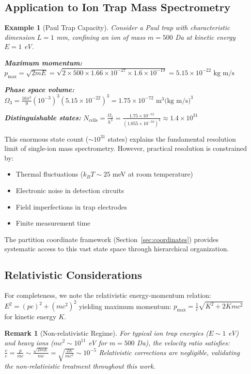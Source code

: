 \documentclass[twocolumn,10pt]{article}
\newtheorem{remark}[theorem]{Remark}
\newtheorem{example}[theorem]{Example}
\begin{document}
\subsection{Application to Ion Trap Mass Spectrometry}

\begin{example}[Paul Trap Capacity]
\label{ex:paul-trap}
Consider a Paul trap with characteristic dimension $L = 1$ mm, confining an ion of mass $m = 500$ Da at kinetic energy $E = 1$ eV.

\textbf{Maximum momentum:}
$
p_{\max} = \sqrt{2mE} = \sqrt{2 \times 500 \times 1.66 \times 10^{-27} \times 1.6 \times 10^{-19}} = 5.15 \times 10^{-22} \text{ kg m/s}
$

\textbf{Phase space volume:}
$
\Omega_3 = \frac{16\pi^2}{9} (10^{-3})^3 (5.15 \times 10^{-22})^3 = 1.75 \times 10^{-72} \text{ m}^3\text{(kg m/s)}^3
$

\textbf{Distinguishable states:}
$
N_{\mathrm{cells}} = \frac{\Omega_3}{h^3} = \frac{1.75 \times 10^{-72}}{(1.055 \times 10^{-34})^3} \approx 1.4 \times 10^{31}
$
\end{example}

This enormous state count ($\sim 10^{31}$ states) explains the fundamental resolution limit of single-ion mass spectrometry. However, practical resolution is constrained by:
\begin{itemize}
    \item Thermal fluctuations ($k_BT \sim 25$ meV at room temperature)
    \item Electronic noise in detection circuits
    \item Field imperfections in trap electrodes
    \item Finite measurement time
\end{itemize}

The partition coordinate framework (Section~\ref{sec:coordinates}) provides systematic access to this vast state space through hierarchical organization.



\subsection{Relativistic Considerations}

For completeness, we note the relativistic energy-momentum relation:
$
E^2 = (pc)^2 + (mc^2)^2
$
yielding maximum momentum:
$
p_{\max} = \frac{1}{c}\sqrt{K^2 + 2Kmc^2}
$
for kinetic energy $K$.

\begin{remark}[Non-relativistic Regime]
For typical ion trap energies ($E \sim 1$ eV) and heavy ions ($mc^2 \sim 10^{11}$ eV for $m = 500$ Da), the velocity ratio satisfies:
$
\frac{v}{c} = \frac{p}{mc} \sim \frac{\sqrt{2mE}}{mc} = \sqrt{\frac{2E}{mc^2}} \sim 10^{-5}
$
Relativistic corrections are negligible, validating the non-relativistic treatment throughout this work.
\end{remark}
\end{document}

